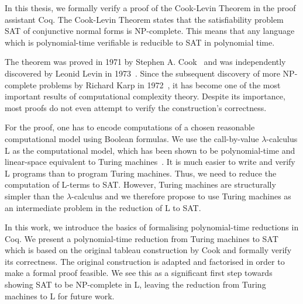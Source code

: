 In this thesis, we formally verify a proof of the Cook-Levin Theorem in the proof assistant Coq.
The Cook-Levin Theorem states that the satisfiability problem SAT of conjunctive normal forms is NP-complete. 
This means that any language which is polynomial-time verifiable is reducible to SAT in polynomial time. 

The theorem was proved in 1971 by Stephen A. Cook~\cite{cook_theorem} and was independently discovered by Leonid Levin in 1973~\cite{levin_theorem}.
Since the subsequent discovery of more NP-complete problems by Richard Karp in 1972~\cite{Karp1972}, it has become one of the most important results of computational complexity theory.
Despite its importance, most proofs do not even attempt to verify the construction's correctness.

For the proof, one has to encode computations of a chosen reasonable computational model using Boolean formulas. 
We use the call-by-value $\lambda$-calculus L as the computational model, which has been shown to be polynomial-time and linear-space equivalent to Turing machines~\cite{ForsterKunzeRoth:2019:wcbv-Reasonable}. It is much easier to write and verify L programs than to program Turing machines.
Thus, we need to reduce the computation of L-terms to SAT.
However, Turing machines are structurally simpler than the $\lambda$-calculus and we therefore propose to use Turing machines as an intermediate problem in the reduction of L to SAT.


In this work, we introduce the basics of formalising polynomial-time reductions in Coq. We present a polynomial-time reduction from Turing machines to SAT which is based on the original tableau construction by Cook and formally verify its correctness. The original construction is adapted and factorised in order to make a formal proof feasible. We see this as a significant first step towards showing SAT to be NP-complete in L, leaving the reduction from Turing machines to L for future work.

